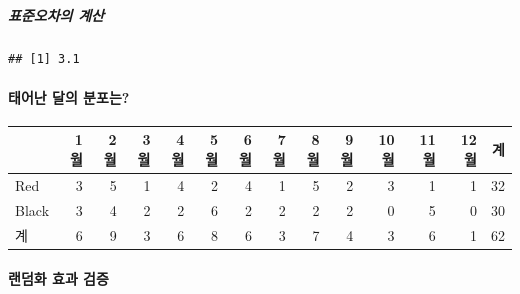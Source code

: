 \documentclass[
]{article}
\begin{document}
\hypertarget{uxd45cuxc900uxc624uxcc28uxc758-uxacc4uxc0b0}{%
\subparagraph{표준오차의
계산}\label{uxd45cuxc900uxc624uxcc28uxc758-uxacc4uxc0b0}}

\begin{verbatim}
## [1] 3.1
\end{verbatim}

\hypertarget{uxd0dcuxc5b4uxb09c-uxb2ecuxc758-uxbd84uxd3ecuxb294}{%
\paragraph{태어난 달의
분포는?}\label{uxd0dcuxc5b4uxb09c-uxb2ecuxc758-uxbd84uxd3ecuxb294}}

\begin{longtable}[]{@{}lrrrrrrrrrrrrr@{}}
\toprule
& 1월 & 2월 & 3월 & 4월 & 5월 & 6월 & 7월 & 8월 & 9월 & 10월 & 11월 &
12월 & 계\tabularnewline
\midrule
\endhead
Red & 3 & 5 & 1 & 4 & 2 & 4 & 1 & 5 & 2 & 3 & 1 & 1 & 32\tabularnewline
Black & 3 & 4 & 2 & 2 & 6 & 2 & 2 & 2 & 2 & 0 & 5 & 0 &
30\tabularnewline
계 & 6 & 9 & 3 & 6 & 8 & 6 & 3 & 7 & 4 & 3 & 6 & 1 & 62\tabularnewline
\bottomrule
\end{longtable}

\hypertarget{uxb79cuxb364uxd654-uxd6a8uxacfc-uxac80uxc99d}{%
\paragraph{랜덤화 효과
검증}\label{uxb79cuxb364uxd654-uxd6a8uxacfc-uxac80uxc99d}}
\end{document}

